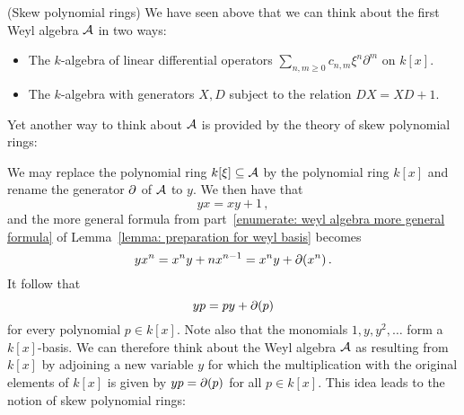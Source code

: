

\begin{remark}(Skew polynomial rings)
  \label{remark: skew polynomial rings}
  We have seen above that we can think about the first Weyl algebra $\operatorname{\mathcal{A}}$ in two ways:
  \begin{itemize}
    \item
      The $k$-algebra of linear differential operators $\sum_{n,m \geq 0} c_{n,m} \xi^n \partial^m$ on $k[x]$.
    \item
      The $k$-algebra with generators $X, D$ subject to the relation $D X = X D + 1$.
  \end{itemize}
  Yet another way to think about $\operatorname{\mathcal{A}}$ is provided by the theory of skew polynomial rings:
  
  We may replace the polynomial ring $k[\xi] \subseteq \operatorname{\mathcal{A}}$ by the polynomial ring $k[x]$ and rename the generator $\partial$ of $\operatorname{\mathcal{A}}$ to $y$.
  We then have that
  \[
    yx = xy + 1 \,,
  \]
  and the more general formula from part~\ref*{enumerate: weyl algebra more general formula} of Lemma~\ref{lemma: preparation for weyl basis} becomes
  \begin{equation}
    \label{equation: motivation skew polynomial ring}
      y x^n
    = x^n y + n x^{n-1}
    = x^n y + \partial(x^n) \,.
  \end{equation}
  It follow that
  \[
      y p
    = p y + \partial(p)
  \]
  for every polynomial $p \in k[x]$.
  Note also that the monomials $1, y, y^2, \dotsc$ form a $k[x]$-basis.
  We can therefore think about the Weyl algebra $\operatorname{\mathcal{A}}$ as resulting from $k[x]$ by adjoining a new variable $y$ for which the multiplication with the original elements of $k[x]$ is given by $y p = \partial(p)$ for all $p \in k[x]$.
  This idea leads to the notion of skew polynomial rings:
  

\end{remark}
